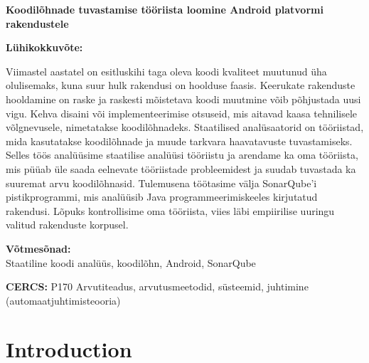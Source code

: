\documentclass[12pt]{article}
\begin{document}
    \newcommand\EstInfo{{%
    \selectlanguage{estonian}
    \noindent\textbf{\large Koodilõhnade tuvastamise tööriista loomine Android platvormi rakendustele}
    \vspace*{1ex}

    \noindent\textbf{Lühikokkuvõte:}

    \noident
    Viimastel aastatel on esitluskihi taga oleva koodi kvaliteet muutunud üha olulisemaks, kuna suur hulk rakendusi on hoolduse faasis.
    Keerukate rakenduste hooldamine on raske ja raskesti mõistetava koodi muutmine võib põhjustada uusi vigu.
    Kehva disaini või implementeerimise otsuseid, mis aitavad kaasa tehnilisele võlgnevusele, nimetatakse koodilõhnadeks.
    Staatilised analüsaatorid on tööriistad, mida kasutatakse koodilõhnade ja muude tarkvara haavatavuste tuvastamiseks.
    Selles töös analüüsime staatilise analüüsi tööriistu ja arendame ka oma tööriista, mis püüab üle saada eelnevate tööriistade probleemidest ja suudab
    tuvastada ka suuremat arvu koodilõhnasid.
    Tulemusena töötasime välja SonarQube'i pistikprogrammi, mis analüüsib Java programmeerimiskeeles kirjutatud rakendusi.
    Lõpuks kontrollisime oma tööriista, viies läbi empiirilise uuringu valitud rakenduste korpusel.

    \vspace*{1ex}

    \noindent\textbf{Võtmesõnad:}\\
    Staatiline koodi analüüs, koodilõhn, Android, SonarQube

    \vspace*{1ex}

    \noindent\textbf{CERCS:} P170 Arvutiteadus, arvutusmeetodid, süsteemid, juhtimine (automaatjuhtimisteooria)

    \vspace*{1ex}
    }}%


    \EngInfo

    \newpage
    \EstInfo


    \newpage
    \tableofcontents

    \newpage

    \section{Introduction}\label{sec:introduction}

    
\end{document}
